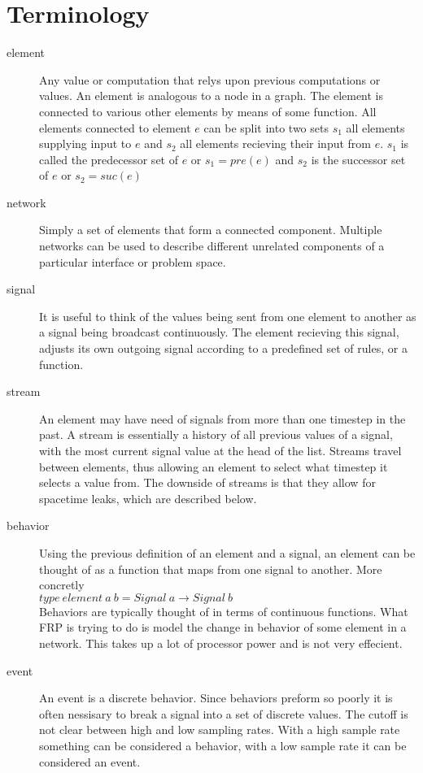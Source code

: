 \documentclass[twocolumn]{paper}
\begin{document}
\section{Terminology}
\begin{description}
\item[element] Any value or computation that relys upon previous computations or values. An element is analogous to a node in a graph. The element is connected to various other elements by means of some function. All elements connected to element $e$ can be split into two sets $s_1$ all elements supplying input to $e$ and $s_2$ all elements recieving their input from $e$. $s_1$ is called the predecessor set of $e$ or $s_1 = pre(e)$ and $s_2$ is the successor set of $e$ or $s_2 = suc(e)$

\item[network] Simply a set of elements that form a connected component. Multiple networks can be used to describe different unrelated components of a particular interface or problem space.

\item[signal] It is useful to think of the values being sent from one element to another as a signal being broadcast continuously. The element recieving this signal, adjusts its own outgoing signal according to a predefined set of rules, or a function.

\item[stream] An element may have need of signals from more than one timestep in the past. A stream is essentially a history of all previous values of a signal, with the most current signal value at the head of the list. Streams travel between elements, thus allowing an element to select what timestep it selects a value from. The downside of streams is that they allow for spacetime leaks, which are described below.

\item[behavior] Using the previous definition of an element and a signal, an element can be thought of as a function that maps from one signal to another. More concretly\\
  $type~element~a~b = Signal ~a \rightarrow Signal ~b$\\
  Behaviors are typically thought of in terms of continuous functions. What FRP is trying to do is model the change in behavior of some element in a network. This takes up a lot of processor power  and is not very effecient.

\item[event] An event is a discrete behavior. Since behaviors preform so poorly it is often nessisary to break a signal into a set of discrete values. The cutoff is not clear between high and low sampling rates. With a high sample rate something can be considered a behavior, with a low sample rate it can be considered an event.


\end{description}
\end{document}
